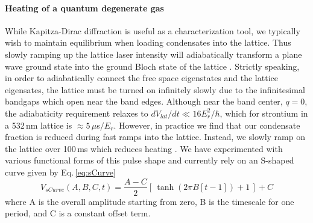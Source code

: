 \paragraph{Heating of a quantum degenerate gas}
While Kapitza-Dirac diffraction is useful as a characterization tool, we typically wish to maintain equilibrium when loading condensates into the lattice. 
Thus slowly ramping up the lattice laser intensity will adiabatically transform a plane wave ground state into the ground Bloch state of the lattice \hl{\cite{Sakurai2010}}. 
Strictly speaking, in order to adiabatically connect the free space eigenstates and the lattice eigensates, the lattice must be turned on infinitely slowly due to the infinitesimal bandgaps which open near the band edges. 
Although near the band center, $q=0$, the adiabaticity requirement relaxes to $dV_{lat}/dt \ll 16E_r^2/ \hbar$, \hl{\cite{Denschlag2002}} which for strontium in a 532\,nm lattice is $\approx 5\,\mu$s$/E_r$. 
However, in practice we find that our condensate fraction is reduced during fast ramps into the lattice. 
Instead, we slowly ramp on the lattice over 100\,ms which reduces heating \cite{Blakie2004}. 
We have experimented with various functional forms of this pulse shape and currently rely on an S-shaped curve given by Eq.\,\ref{eq:sCurve}
\begin{equation} \label{eq:sCurve}
	V_{sCurve}(A,B,C,t) = \frac{A-C}{2} \left[ \, \tanh (2 \pi B[t-1])+1 \, \right] + C
\end{equation}
where A is the overall amplitude starting from zero, B is the timescale for one period, and C is a constant offset term.

